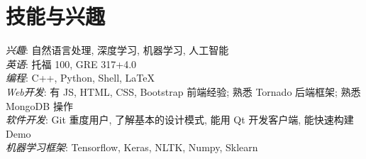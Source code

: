 \section{技能与兴趣}
\textit{兴趣}: 自然语言处理, 深度学习, 机器学习, 人工智能\\
\textit{英语}: 托福 100, GRE 317+4.0\\
\textit{编程}: C++, Python, Shell, LaTeX\\
\textit{Web开发}: 有 JS, HTML, CSS, Bootstrap 前端经验; 熟悉 Tornado 后端框架; 熟悉 MongoDB 操作\\
\textit{软件开发}: Git 重度用户, 了解基本的设计模式, 能用 Qt 开发客户端, 能快速构建 Demo\\
\textit{机器学习框架}: Tensorflow, Keras, NLTK, Numpy, Sklearn\\

